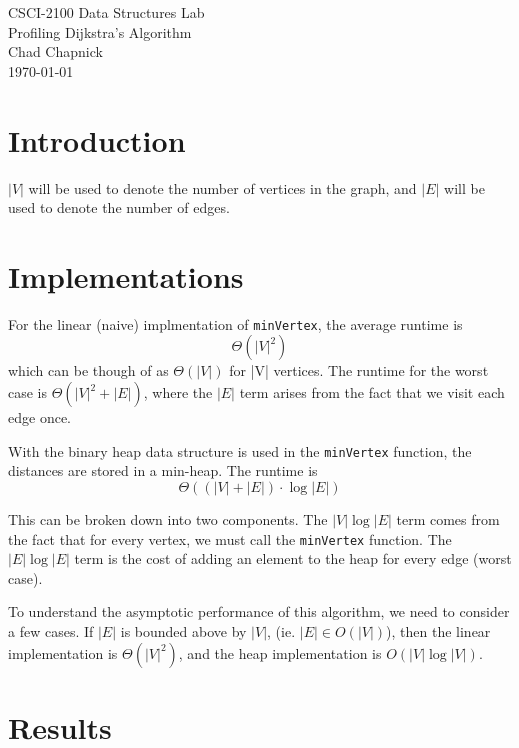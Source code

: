 \documentclass[technote]{IEEEtran}
\begin{document}
\begin{titlepage}
    \vspace*{\fill}
    \begin{center}
        {\Huge CSCI-2100 Data Structures Lab}\\[0.3cm]
        {\huge Profiling Dijkstra's Algorithm}\\[0.6cm]
        {\Large Chad Chapnick}\\[0.4cm]
        {\small\today}
    \end{center}
    \vspace*{\fill}
\end{titlepage}
\section{Introduction}

$|V|$ will be used to denote the number of vertices in the graph, and 
$|E|$ will be used to denote the number of edges.



\section{Implementations}

For the linear (naive) implmentation of \texttt{minVertex}, the average runtime is 
$$\Theta(|V|^2)$$
which can be though of as $\Theta(|V|)$ for |V| vertices.
The runtime for the worst case is $\Theta(|V|^2 + |E|)$, 
where the $|E|$ term arises from the fact that we visit each edge once.

With the binary heap data structure is used in the \texttt{minVertex} function, 
the distances are stored in a min-heap.
The runtime is 
$$\Theta ( (|V| + |E|) \cdot \log|E| )$$

This can be broken down into two components. 
The $|V|\log|E|$ term comes from the fact that for every vertex, 
we must call the \texttt{minVertex} function.
The $|E|\log|E|$ term is the cost of adding an element to the 
heap for every edge (worst case).


To understand the asymptotic performance of this algorithm, 
we need to consider a few cases.
If $|E|$ is bounded above by $|V|$, (ie. $|E| \in O(|V|)$), 
then the linear implementation is $\Theta(|V|^2)$, 
and the heap implementation is $O(|V| \log |V|)$.



\section{Results}
\end{document}
